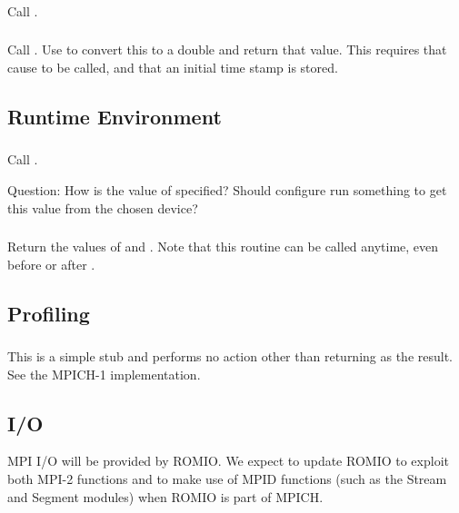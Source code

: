 \documentclass{article}
\begin{document}
\subsubsection{}
Call .

\subsubsection{}
Call .  Use  to convert this to
a double and return that value.
This requires that  cause  to be
called, and that an initial time stamp is stored.

\subsection{Runtime Environment}
\label{sec:runtime-env}
\subsubsection{}
Call .  

Question: How is the value of  specified?
Should configure run something to get this value from the chosen device?

\subsubsection{}
Return the values of  and . 
Note that this routine can be called anytime, even before  or
after .

\subsection{Profiling}
\label{sec:profile}

\subsubsection{}
This is a simple stub and performs no action other than returning
 as the result.  See the MPICH-1 implementation.

\subsection{I/O}
MPI I/O will be provided by ROMIO.  We expect to update ROMIO to exploit both
MPI-2 functions and to make use of MPID functions (such as the Stream and
Segment modules) when ROMIO is part of MPICH.
\end{document}

